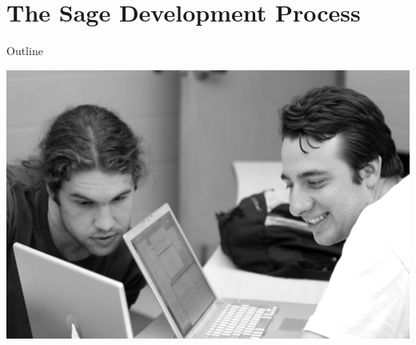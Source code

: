 \documentclass[11pt,blackandwhite]{beamer}
\begin{document}
\section{The Sage Development Process}
\begin{frame}{Outline}
\tableofcontents[sectionstyle=show/shaded]
\begin{flushright}
\includegraphics[height=0.3\textwidth]{process.jpg}
\end{flushright}
\end{frame}
\end{document}

